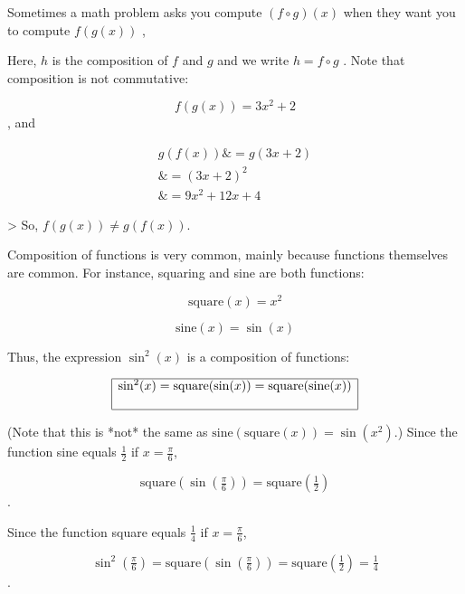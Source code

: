 Sometimes a math problem asks you compute $(f\circ g)(x)$ when they want you to compute $f(g(x))$ ,



Here, $h$ is the composition of $f$ and $g$ and we write $h=f\circ g$ . Note that
composition is not commutative:



$$f(g(x))=3x^2+2$$ , and



\begin{align}
g(f(x)) \& = g(3x+2) \\
        \& = (3x+2)^2 \\
        \& = 9x^2+12x+4 \,
\end{align}



> So, $f(g(x))\ne g(f(x))$.



Composition of functions is very common, mainly because functions themselves are common.
For instance, squaring and sine are both functions:



$$\text{square}(x)=x^2$$



$$\text{sine}(x)=\sin(x)$$



Thus, the expression $\sin^2(x)$ is a composition of functions:



$$\begin{array}{|c|} \hline \sin^2(x) = \text{square}(\sin(x)) = \text{square}(\text{sine}(x)) \\
    \\ \hline \end{array}$$



(Note that this is *not* the same as $\text{sine}(\text{square}(x)) = \sin(x^2)$.) Since
the function sine equals $\tfrac{1}{2}$ if $x = \tfrac{\pi}{6}$,



$$\text{square}\left(\sin\left(\tfrac{\pi}{6}\right)\right) =
\text{square}\left(\tfrac{1}{2}\right)$$.



Since the function square equals $\tfrac{1}{4}$ if $x = \tfrac{\pi}{6}$,



$$\sin^2\left(\tfrac{\pi}{6}\right) =
\text{square}\left(\sin\left(\tfrac{\pi}{6}\right)\right) =
\text{square}\left(\tfrac{1}{2}\right) = \tfrac{1}{4}$$.



